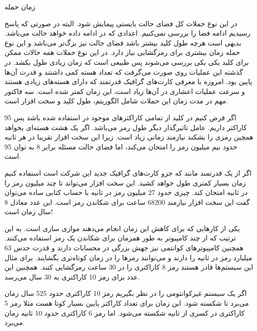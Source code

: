 \Problem
{زمان حمله }
{
در این نوع حملات کل فضای حالت بایستی پیمایش شود. البته در صورتی که پاسخ رسیدیم ادامه فضا را بررسی نمی‌کنیم. اعدادی که در ادامه داده خواهد حالت
می‌باشد.
بدیهی است هرچه طول کلید بیشتر باشد فضای حالت نیز بزگ‌تر می‌باشد و این نوع حمله زمان بیشتری برای رمزگشایی نیاز دارد.
در این نوع حملات همه حالات ممکن برای کلید یکی یکی بررسی می‌شوند پس طبیعی است که زمان زیادی طول بکشد.
در گذشته این عملیات روی
صورت می‌گرفت که تعداد هسته کمی داشتند و قدرت
آن‌ها پایین بود.
امروزه با معرفی کارت‌های گرافیک
قدرتمند که دارای هسته‌های زیادی هستند و سرعت عملیات اعشاری در آن‌ها زیاد است، این زمان کمتر شده است.
سه فاکتور مهم در مدت زمان این حملات شامل الگوریتم، طول کلید و سخت افزار است.

اگر فرض کنیم در کلید از تمامی کاراکترهای موجود در
استفاده شده باشد پس 95 کاراکتر داریم.
عامل تاثیرگذار دیگر طول رمز می‌باشد.
اگر یک
هشت هسته‌ای بخواهد همچین رمزی را بشکند نیازمند زمانی زیاد است. زیرا این سخت افزار تقریبا در هر ثانیه حدود نیم میلیون رمز را امتحان می‌کند، اما فضای حالت مسئله برابر 8 به توان 95 است.

اگر از یک
قدرتمند مانند
که جزو کارت‌های گرافیک جدید این شرکت است استفاده کنیم زمان بسیار کمتری طول خواهد کشید.
این سخت افزار می‌تواند تا چند میلیون رمز را در ثانیه امتحان کند.
چیزی حدود 27 میلیون رمز در ثانیه
با حساب کتابی ساده می‌توان گفت این سخت افزار نیازمند 68200 ساعت برای شکاندن رمز است.
این عدد معادل 8 سال زمان است!

یکی از کارهایی که برای کاهش این زمان انجام می‌دهند موازی سازی است. به این ترتیب که از چند کامپیوتر به طور همزمان برای شکاندن یک رمز استفاده می‌کنند.
همچنین کامپیوترهای کوانتمی نیز جهش بزرگی در محسابات دارند و قدرت حدس 63 میلیارد رمز در ثانیه را دارند و می‌توانند رمزها را در زمان کوتاه‌تری بگشایند. برای مثال این سیستم‌ها قادر هستند رمز 8 کاراکتری را در 30 ساعت رمزگشایی کنند. همچنین این عدد برای رمز 10 کاراکتری به 30 سال می‌رسد.

اگر یک سیستم غیرکوانتومی را در نظر بگیریم رمز 10 کاراکتری حدود 525 سال زمان می‌برد تا شکسته شود. این زمان برای تعداد کاراکتر پایین بسیار کوتا هست مثلا رمز 5 کاراکتری در کسری از ثانیه شکسته می‌شود. اما رمز 6 کاراکتری حدود 10 ثانیه زمان می‌برد.
}

